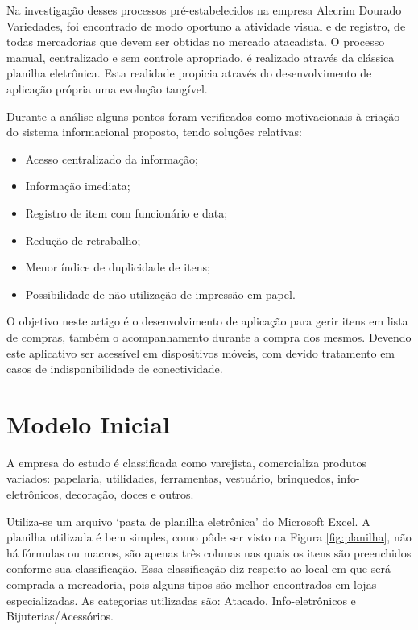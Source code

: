 \documentclass[12pt]{article}
\begin{document}
Na investigação desses processos pré-estabelecidos na empresa Alecrim Dourado Variedades, foi encontrado de modo oportuno a atividade visual e de registro, de todas mercadorias que devem ser obtidas no mercado atacadista. O processo manual, centralizado e sem controle apropriado, é realizado através da clássica planilha eletrônica. Esta realidade propicia através do desenvolvimento de aplicação própria uma evolução tangível.

Durante a análise alguns pontos foram verificados como motivacionais à criação do sistema informacional proposto, tendo soluções relativas:
\begin{itemize}
\item Acesso centralizado da informação;
\item Informação imediata;
\item Registro de item com funcionário e data;
\item Redução de retrabalho;
\item Menor índice de duplicidade de itens;
\item Possibilidade de não utilização de impressão em papel.
\end{itemize}

O objetivo neste artigo é o desenvolvimento de aplicação para gerir itens em lista de compras, também o acompanhamento durante a compra dos mesmos. Devendo este aplicativo ser acessível em dispositivos móveis, com devido tratamento em casos de indisponibilidade de conectividade.

\section{Modelo Inicial}

A empresa do estudo é classificada como varejista, comercializa produtos variados: papelaria, utilidades, ferramentas, vestuário, brinquedos, info-eletrônicos, decoração, doces e outros.

Utiliza-se um arquivo `pasta de planilha eletrônica' do Microsoft Excel. A planilha utilizada é bem simples, como pôde ser visto na Figura  \ref{fig:planilha}, não há fórmulas ou macros, são apenas três colunas nas quais os itens são preenchidos conforme sua classificação. Essa classificação diz respeito ao local em que será comprada a mercadoria, pois alguns tipos são melhor encontrados em lojas especializadas. As categorias utilizadas são: Atacado, Info-eletrônicos e Bijuterias/Acessórios.
\end{document}
